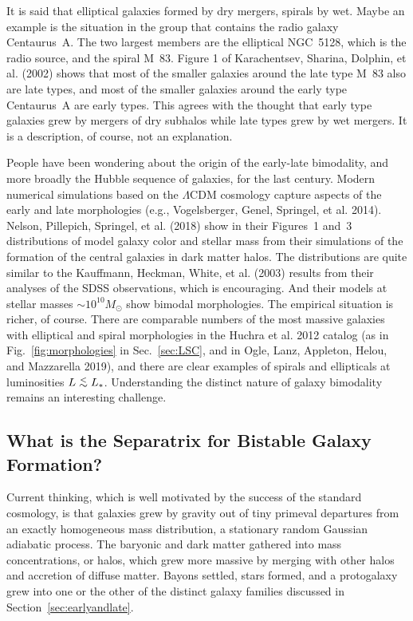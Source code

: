 \documentclass[fleqn,12pt]{article}
\def\lap{\lower.5ex\hbox{$\; \buildrel < \over \sim \;$}}
\begin{document}
It is said that elliptical galaxies formed by dry mergers, spirals by wet. Maybe an example is the situation in the group that contains the radio galaxy Centaurus~A. The two largest members are the elliptical NGC~5128, which is the radio source, and the spiral M~83.  Figure 1 of  Karachentsev, Sharina, Dolphin, et al. (2002) shows that most of the smaller galaxies around the late type M~83 also are late types, and most of the smaller galaxies around the early type Centaurus~A are early types. This agrees with the thought that early type galaxies grew by mergers of dry subhalos while late types grew by wet mergers. It is a description, of course, not an explanation.

People have been wondering about the origin of the early-late bimodality, and more broadly the Hubble sequence of galaxies, for the last century. Modern numerical simulations based on the $\Lambda$CDM cosmology capture aspects of the early and late morphologies (e.g., Vogelsberger, Genel, Springel, et al. 2014). Nelson, Pillepich, Springel, et al. (2018) show in their Figures~1 and~3 distributions of model galaxy color and stellar mass from their simulations of the formation of the central galaxies in dark matter halos. The distributions are quite similar to the Kauffmann, Heckman, White, et al. (2003) results from their analyses of the SDSS observations, which is encouraging. And their models at stellar masses $\sim 10^{10}M_\odot$ show bimodal morphologies. The empirical situation is richer, of course.  There are comparable numbers of the most massive galaxies with elliptical and spiral morphologies in the Huchra et al. 2012 catalog (as in Fig.~\ref{fig:morphologies} in Sec.~\ref{sec:LSC}, and in Ogle, Lanz, Appleton, Helou, and Mazzarella 2019), and there are clear examples of spirals and ellipticals at luminosities $L\lap L_\ast$. Understanding the distinct nature of galaxy bimodality remains an interesting challenge.

\subsection{What is the Separatrix for Bistable Galaxy Formation?}\label{separatrix} 

Current thinking, which is well motivated by the success of the standard cosmology, is that galaxies grew by gravity out of tiny primeval departures from an exactly homogeneous mass distribution, a stationary random Gaussian adiabatic process. The baryonic and dark matter gathered into mass concentrations, or halos, which grew more massive by merging with other halos and accretion of diffuse matter. Bayons settled, stars formed, and a protogalaxy grew into one or the other of the distinct galaxy families discussed in Section~\ref{sec:earlyandlate}.
\end{document}
